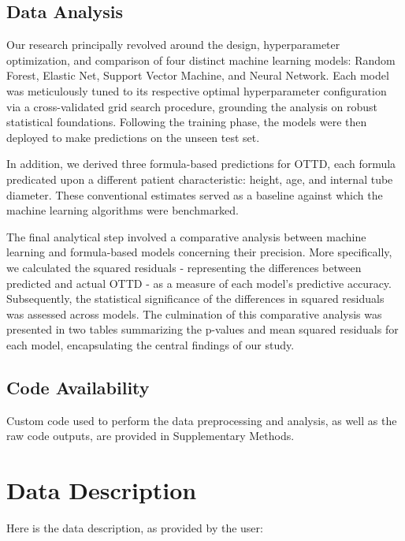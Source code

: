 \documentclass[11pt]{article}
\begin{document}
\subsection*{Data Analysis}
Our research principally revolved around the design, hyperparameter optimization, and comparison of four distinct machine learning models: Random Forest, Elastic Net, Support Vector Machine, and Neural Network. Each model was meticulously tuned to its respective optimal hyperparameter configuration via a cross-validated grid search procedure, grounding the analysis on robust statistical foundations. Following the training phase, the models were then deployed to make predictions on the unseen test set.

In addition, we derived three formula-based predictions for OTTD, each formula predicated upon a different patient characteristic: height, age, and internal tube diameter. These conventional estimates served as a baseline against which the machine learning algorithms were benchmarked.

The final analytical step involved a comparative analysis between machine learning and formula-based models concerning their precision. More specifically, we calculated the squared residuals - representing the differences between predicted and actual OTTD - as a measure of each model's predictive accuracy. Subsequently, the statistical significance of the differences in squared residuals was assessed across models. The culmination of this comparative analysis was presented in two tables summarizing the p-values and mean squared residuals for each model, encapsulating the central findings of our study.\subsection*{Code Availability}

Custom code used to perform the data preprocessing and analysis, as well as the raw code outputs, are provided in Supplementary Methods.






\clearpage
\appendix

\section{Data Description} \label{sec:data_description} Here is the data description, as provided by the user:
\end{document}
